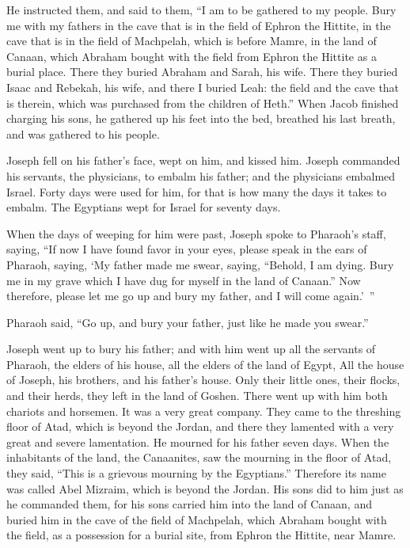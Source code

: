 {He instructed them, and said to them, “I am to be gathered to my people. Bury me with my fathers in the cave that is in the field of Ephron the Hittite,
in the cave that is in the field of Machpelah, which is before Mamre, in the land of Canaan, which Abraham bought with the field from Ephron the Hittite as a burial place.
There they buried Abraham and Sarah, his wife. There they buried Isaac and Rebekah, his wife, and there I buried Leah:
the field and the cave that is therein, which was purchased from the children of Heth.”
When Jacob finished charging his sons, he gathered up his feet into the bed, breathed his last breath, and was gathered to his people.

Joseph fell on his father’s face, wept on him, and kissed him.
Joseph commanded his servants, the physicians, to embalm his father; and the physicians embalmed Israel.
Forty days were used for him, for that is how many the days it takes to embalm. The Egyptians wept for Israel for seventy days.
\par }{\PP {}When the days of weeping for him were past, Joseph spoke to Pharaoh’s staff, saying, “If now I have found favor in your eyes, please speak in the ears of Pharaoh, saying,
‘My father made me swear, saying, “Behold, I am dying. Bury me in my grave which I have dug for myself in the land of Canaan.” Now therefore, please let me go up and bury my father, and I will come again.’ ”
\par }{\PP {}Pharaoh said, “Go up, and bury your father, just like he made you swear.”
\par }{\PP {}Joseph went up to bury his father; and with him went up all the servants of Pharaoh, the elders of his house, all the elders of the land of Egypt,
All the house of Joseph, his brothers, and his father’s house. Only their little ones, their flocks, and their herds, they left in the land of Goshen.
There went up with him both chariots and horsemen. It was a very great company.
They came to the threshing floor of Atad, which is beyond the Jordan, and there they lamented with a very great and severe lamentation. He mourned for his father seven days.
When the inhabitants of the land, the Canaanites, saw the mourning in the floor of Atad, they said, “This is a grievous mourning by the Egyptians.” Therefore its name was called Abel Mizraim, which is beyond the Jordan.
His sons did to him just as he commanded them,
for his sons carried him into the land of Canaan, and buried him in the cave of the field of Machpelah, which Abraham bought with the field, as a possession for a burial site, from Ephron the Hittite, near Mamre.
}
